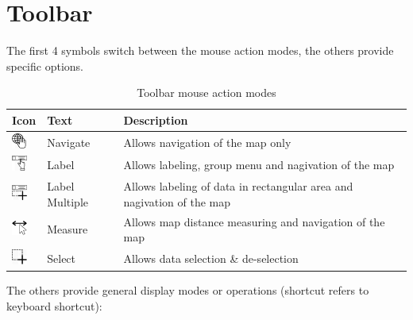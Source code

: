 \section{Toolbar}

The first 4 symbols switch between the mouse action modes, the others provide specific options.

\begin{table}[H]
  \center
  \begin{tabular}{ | l | l | l |}
    \hline
    \textbf{Icon} & \textbf{Text} &  \textbf{Description} \\ \hline
    \includegraphics[width=0.5cm,frame]{../../data/icons/navigate.png} & Navigate & Allows navigation of the map only \\ \hline
    \includegraphics[width=0.5cm,frame]{../../data/icons/label_action.png} & Label & Allows labeling, group menu and nagivation of the map \\ \hline
    \includegraphics[width=0.5cm,frame]{../../data/icons/label_multiple_action.png} & Label Multiple & Allows labeling of data in rectangular area and nagivation of the map \\ \hline
    \includegraphics[width=0.5cm,frame]{../../data/icons/measure_action.png} & Measure & Allows map distance measuring and navigation of the map \\ \hline
    \includegraphics[width=0.5cm,frame]{../../data/icons/select_action.png} & Select & Allows data selection \& de-selection \\ \hline
  \end{tabular}
  \caption{Toolbar mouse action modes}
\end{table}

The others provide general display modes or operations (shortcut refers to keyboard shortcut):

